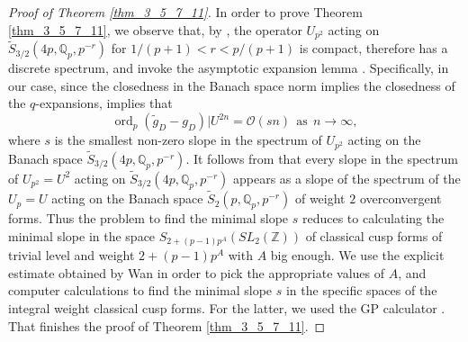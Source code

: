 \documentclass[11pt,letterpaper]{amsart}
\newcommand{\Z}{{\mathbb Z}}
\newcommand{\Q}{{\mathbb Q}}
\newcommand{\cO}{{\mathcal O}}
\DeclareMathOperator{\ord}{ord}
\theoremstyle{remark}
\begin{document}
\begin{proof}[Proof of Theorem \ref{thm_3_5_7_11}]
In order to prove Theorem \ref{thm_3_5_7_11}, we observe that, by  \cite[Proposition 5.1]{Ramsey}, the operator 
$U_{p^2}$ acting on $\tilde{S}_{3/2}   (4p, \Q_p, p^{-r})$  for $1/(p+1) < r < p/(p+1)$ is compact, therefore has a discrete spectrum, and invoke the asymptotic expansion lemma \cite[Proposition 1]{Gouvea_Mazur}. Specifically, in our case, since the closedness in the Banach space norm implies the closedness of the $q$-expansions, \cite[Proposition 1]{Gouvea_Mazur} implies that
\[
\ord_p \left(\tilde{g}_D - g_D\right)|U^{2n} = \cO(sn) ~~\text{as} ~~ n \rightarrow \infty,
\]
where $s$ is the smallest non-zero slope in the spectrum of  $U_{p^2}$ acting on the Banach space $\tilde{S}_{3/2}   (4p, \Q_p, p^{-r})$. It follows from \cite[Lemma 5.3]{Ramsey_sh} that every slope in the spectrum of  $U_{p^2}=U^2$ acting on 
$\tilde{S}_{3/2}   (4p, \Q_p, p^{-r})$ appears as a slope of the spectrum of the $U_p = U$ acting on the Banach space 
$\tilde{S}_{2}   (p, \Q_p, p^{-r})$ of weight $2$ overconvergent forms. Thus the problem to find the minimal slope $s$ reduces to calculating the minimal slope in the space 
$S_{2+(p-1)p^A}(SL_2(\Z))$ of classical cusp forms of trivial level and weight $2+(p-1)p^A$ with $A$ big enough. We use  the explicit estimate obtained by Wan \cite{Wan} in order to pick the appropriate values of $A$, and computer calculations to find the minimal slope $s$ in the specific spaces of the integral weight classical cusp forms. For the latter, we used the GP calculator  \cite{PARI2}.
That finishes the proof of Theorem \ref{thm_3_5_7_11}. \end{proof}
\end{document}
